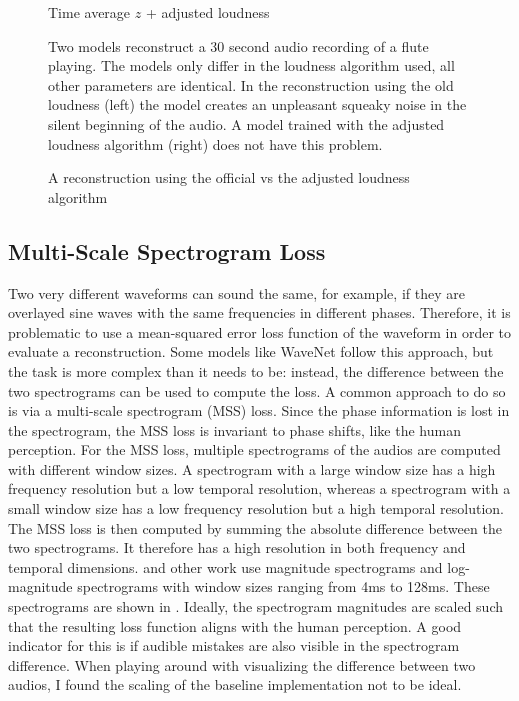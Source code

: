 \begin{figure}
\begin{minipage}[b]{0.45\textwidth}
        \small Time average $z$ + adjusted loudness
    \end{minipage}
    \caption{A reconstruction using the official vs the adjusted loudness algorithm}
    \label{fig:loudness-rec}
    \small Two models reconstruct a 30 second audio recording of a flute playing. The models only differ in the loudness algorithm used, all other parameters are identical. In the reconstruction using the old loudness (left) the model creates an unpleasant squeaky noise in the silent beginning of the audio. A model trained with the adjusted loudness algorithm (right) does not have this problem.
\end{figure}

\subsection{Multi-Scale Spectrogram Loss}
Two very different waveforms can sound the same, for example, if they are overlayed sine waves with the same frequencies in different phases.
Therefore, it is problematic to use a mean-squared error loss function of the waveform in order to evaluate a reconstruction.
Some models like WaveNet follow this approach, but the task is more complex than it needs to be: instead, the difference between the two spectrograms can be used to compute the loss.  \newline
A common approach to do so is via a multi-scale spectrogram (MSS) loss.
Since the phase information is lost in the spectrogram, the MSS loss is invariant to phase shifts, like the human perception. 
For the MSS loss, multiple spectrograms of the audios are computed with different window sizes.
A spectrogram with a large window size has a high frequency resolution but a low temporal resolution, whereas a spectrogram with a small window size has a low frequency resolution but a high temporal resolution.
The MSS loss is then computed by summing the absolute difference between the two spectrograms. It therefore has a high resolution in both frequency and temporal dimensions. \newline
\cite{ddsp} and other work use magnitude spectrograms and log-magnitude spectrograms with window sizes ranging from 4ms to 128ms.
These spectrograms are shown in . \newline
Ideally, the spectrogram magnitudes are scaled such that the resulting loss function aligns with the human perception.
A good indicator for this is if audible mistakes are also visible in the spectrogram difference.
When playing around with visualizing the difference between two audios, I found the scaling of the baseline implementation not to be ideal.

